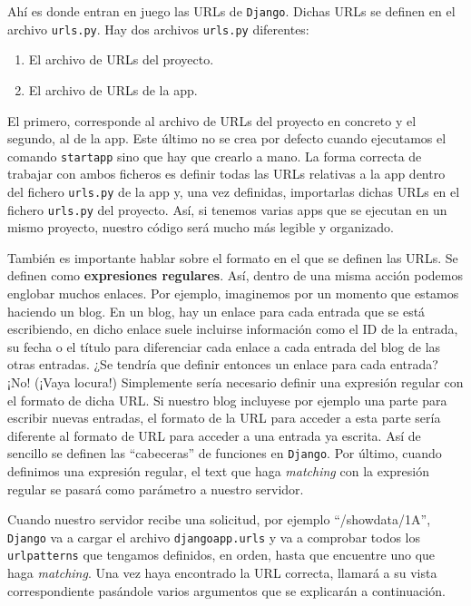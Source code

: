 Ahí es donde entran en juego las URLs de \texttt{Django}. Dichas URLs se definen en el archivo \texttt{urls.py}. Hay dos archivos \texttt{urls.py} diferentes:
\begin{enumerate}[---]
    \item El archivo de URLs del proyecto.
    \item El archivo de URLs de la app.
\end{enumerate}

El primero, corresponde al archivo de URLs del proyecto en concreto y el segundo, al de la app. Este último no se crea por defecto cuando ejecutamos el comando \texttt{startapp} sino que hay que crearlo a mano. La forma correcta de trabajar con ambos ficheros es definir todas las URLs relativas a la app dentro del fichero \texttt{urls.py} de la app y, una vez definidas, importarlas dichas URLs en el fichero \texttt{urls.py} del proyecto. Así, si tenemos varias apps que se ejecutan en un mismo proyecto, nuestro código será mucho más legible y organizado. 

También es importante hablar sobre el formato en el que se definen las URLs. Se definen como \textbf{expresiones regulares}. Así, dentro de una misma acción podemos englobar muchos enlaces. Por ejemplo, imaginemos por un momento que estamos haciendo un blog. En un blog, hay un enlace para cada entrada que se está escribiendo, en dicho enlace suele incluirse información como el ID de la entrada, su fecha o el título para diferenciar cada enlace a cada entrada del blog de las otras entradas. ¿Se tendría que definir entonces un enlace para cada entrada? ¡No! (¡Vaya locura!) Simplemente sería necesario definir una expresión regular con el formato de dicha URL. Si nuestro blog incluyese por ejemplo una parte para escribir nuevas entradas, el formato de la URL para acceder a esta parte sería diferente al formato de URL para acceder a una entrada ya escrita. Así de sencillo se definen las ``cabeceras'' de funciones en \texttt{Django}. Por último, cuando definimos una expresión regular, el text que haga \textit{matching} con la expresión regular se pasará como parámetro a nuestro servidor.

Cuando nuestro servidor recibe una solicitud, por ejemplo ``/showdata/1A'', \texttt{Django} va a cargar el archivo \texttt{djangoapp.urls} y va a comprobar todos los \texttt{urlpatterns} que tengamos definidos, en orden, hasta que encuentre uno que haga \textit{matching}. Una vez haya encontrado la URL correcta, llamará a su vista correspondiente pasándole varios argumentos que se explicarán a continuación.

